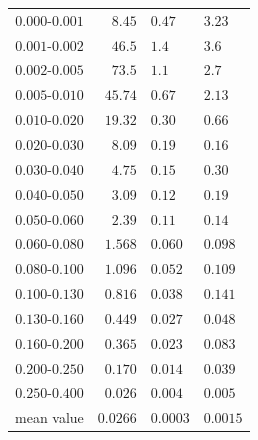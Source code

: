 \documentclass[12pt,a4paper,twoside]{article}
\begin{document}
\begin{table}[!htb]
\begin{center}
\begin{tabular}{|r||r@{ $\pm$ }l@{ $\pm$ }l|}
\hline\hline
$ 0.000$-$0.001 $&$  8.45  $&$  0.47  $&$  3.23  $\\
$ 0.001$-$0.002 $&$ 46.5   $&$  1.4   $&$  3.6   $\\
$ 0.002$-$0.005 $&$ 73.5   $&$  1.1   $&$  2.7   $\\
$ 0.005$-$0.010 $&$ 45.74  $&$  0.67  $&$  2.13  $\\
$ 0.010$-$0.020 $&$ 19.32  $&$  0.30  $&$  0.66  $\\
$ 0.020$-$0.030 $&$  8.09  $&$  0.19  $&$  0.16  $\\
$ 0.030$-$0.040 $&$  4.75  $&$  0.15  $&$  0.30  $\\
$ 0.040$-$0.050 $&$  3.09  $&$  0.12  $&$  0.19  $\\
$ 0.050$-$0.060 $&$  2.39  $&$  0.11  $&$  0.14  $\\
$ 0.060$-$0.080 $&$  1.568 $&$  0.060 $&$  0.098 $\\
$ 0.080$-$0.100 $&$  1.096 $&$  0.052 $&$  0.109 $\\
$ 0.100$-$0.130 $&$  0.816 $&$  0.038 $&$  0.141 $\\
$ 0.130$-$0.160 $&$  0.449 $&$  0.027 $&$  0.048 $\\
$ 0.160$-$0.200 $&$  0.365 $&$  0.023 $&$  0.083 $\\
$ 0.200$-$0.250 $&$  0.170 $&$  0.014 $&$  0.039 $\\
$ 0.250$-$0.400 $&$  0.026 $&$  0.004 $&$  0.005 $\\
\hline\hline
mean value       &$  0.0266 $&$ 0.0003 $&$ 0.0015 $\\
\hline
\end{tabular}


\end{center}
\end{table}
\end{document}
